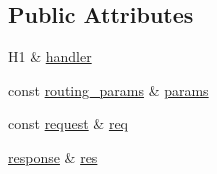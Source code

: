 \subsection*{Public Attributes}
\begin{DoxyCompactItemize}
\item 
H1 \& \hyperlink{structcrow_1_1detail_1_1routing__handler__call__helper_1_1call__params_a4ce1d7e1b3b191aaaea19bbc3ad61e0d}{handler}
\item 
const \hyperlink{structcrow_1_1routing__params}{routing\-\_\-params} \& \hyperlink{structcrow_1_1detail_1_1routing__handler__call__helper_1_1call__params_a3e6c2066cd82b91d35550db36513d4bc}{params}
\item 
const \hyperlink{structcrow_1_1request}{request} \& \hyperlink{structcrow_1_1detail_1_1routing__handler__call__helper_1_1call__params_a1938f3328078453302e5a7a4fa994a40}{req}
\item 
\hyperlink{structcrow_1_1response}{response} \& \hyperlink{structcrow_1_1detail_1_1routing__handler__call__helper_1_1call__params_ad63d6c1902dab21178b1b2644ec0d407}{res}
\end{DoxyCompactItemize}


